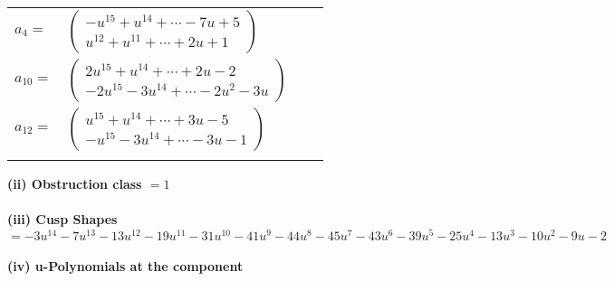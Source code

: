 \documentclass[1p]{elsarticle_modified}
\theoremstyle{definition}
\begin{document}
\begin{tabular}{m{7pt} m{180pt} m{7pt} m{180pt} }
\flushright $a_{4}=$&$\begin{pmatrix}- u^{15}+u^{14}+\cdots-7 u+5\\u^{12}+u^{11}+\cdots+2 u+1\end{pmatrix}$ \\
\flushright $a_{10}=$&$\begin{pmatrix}2 u^{15}+u^{14}+\cdots+2 u-2\\-2 u^{15}-3 u^{14}+\cdots-2 u^2-3 u\end{pmatrix}$ \\
\flushright $a_{12}=$&$\begin{pmatrix}u^{15}+u^{14}+\cdots+3 u-5\\- u^{15}-3 u^{14}+\cdots-3 u-1\end{pmatrix}$\\&\end{tabular}
\flushleft \textbf{(ii) Obstruction class $= 1$}\\~\\
\flushleft \textbf{(iii) Cusp Shapes $= -3 u^{14}-7 u^{13}-13 u^{12}-19 u^{11}-31 u^{10}-41 u^9-44 u^8-45 u^7-43 u^6-39 u^5-25 u^4-13 u^3-10 u^2-9 u-2$}\\~\\
\newpage\renewcommand{\arraystretch}{1}
\flushleft \textbf{(iv) u-Polynomials at the component}\newline \\
\end{document}
